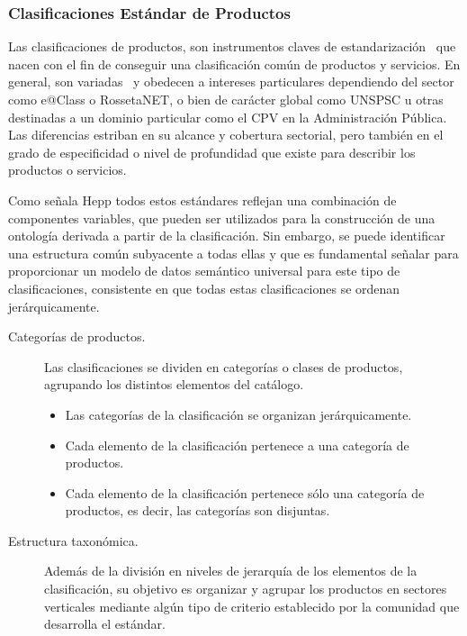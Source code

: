 \subsubsection{Clasificaciones Estándar de Productos}\label{semantica:pscs}
Las clasificaciones de productos, son instrumentos claves de estandarización~\cite{Leukel-standard} que nacen con el fin de
conseguir una clasificación común de productos y servicios. En general, son variadas~\cite{Leukel-ecatalog2005}
y obedecen a intereses particulares dependiendo del sector como e@Class o RossetaNET,
o bien de carácter global como \gls{UNSPSC} u otras destinadas a un dominio particular como el \gls{CPV} en la Administración Pública.
Las diferencias estriban en su alcance y cobertura sectorial, pero también en el grado de especificidad o nivel
de profundidad que existe para describir los productos o servicios.

Como señala Hepp\cite{HeppTrueComplexity,HeppEclass,HeppMethodology} todos estos
estándares reflejan una combinación de componentes variables, que pueden ser
utilizados para la construcción de una ontología derivada a partir de la clasificación.
Sin embargo, se puede identificar una estructura común subyacente a todas ellas y
que es fundamental señalar para proporcionar un modelo de datos semántico universal para este tipo de clasificaciones, consistente 
en que todas estas clasificaciones se ordenan jerárquicamente. 

\begin{description}
 \item [Categorías de productos.] Las clasificaciones se dividen en categorías o
clases de productos, agrupando los distintos elementos del catálogo.
\begin{itemize}
 \item Las categorías de la clasificación se organizan jerárquicamente.
 \item Cada elemento de la clasificación pertenece a una categoría de
productos.
 \item Cada elemento de la clasificación pertenece sólo una categoría de
productos, es decir, las categorías son disjuntas.
\end{itemize}

\item  [Estructura taxonómica.] Además de la división en niveles de jerarquía
de los elementos de la clasificación, su objetivo es organizar y agrupar los productos en
sectores verticales mediante algún tipo de criterio establecido por la comunidad
que desarrolla el estándar. 
 
\end{description}

